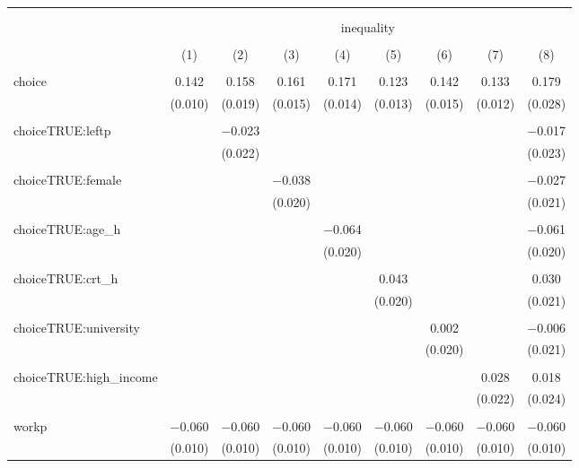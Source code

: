 
\begin{table}[!htbp] \centering 
  \caption{} 
  \label{} 
\begin{tabular}{@{\extracolsep{5pt}}lcccccccc} 
\\[-1.8ex]\hline 
\hline \\[-1.8ex] 
\\[-1.8ex] & \multicolumn{8}{c}{inequality} \\ 
\\[-1.8ex] & (1) & (2) & (3) & (4) & (5) & (6) & (7) & (8)\\ 
\hline \\[-1.8ex] 
 choice & 0.142 & 0.158 & 0.161 & 0.171 & 0.123 & 0.142 & 0.133 & 0.179 \\ 
  & (0.010) & (0.019) & (0.015) & (0.014) & (0.013) & (0.015) & (0.012) & (0.028) \\ 
  & & & & & & & & \\ 
 choiceTRUE:leftp &  & $-$0.023 &  &  &  &  &  & $-$0.017 \\ 
  &  & (0.022) &  &  &  &  &  & (0.023) \\ 
  & & & & & & & & \\ 
 choiceTRUE:female &  &  & $-$0.038 &  &  &  &  & $-$0.027 \\ 
  &  &  & (0.020) &  &  &  &  & (0.021) \\ 
  & & & & & & & & \\ 
 choiceTRUE:age\_h &  &  &  & $-$0.064 &  &  &  & $-$0.061 \\ 
  &  &  &  & (0.020) &  &  &  & (0.020) \\ 
  & & & & & & & & \\ 
 choiceTRUE:crt\_h &  &  &  &  & 0.043 &  &  & 0.030 \\ 
  &  &  &  &  & (0.020) &  &  & (0.021) \\ 
  & & & & & & & & \\ 
 choiceTRUE:university &  &  &  &  &  & 0.002 &  & $-$0.006 \\ 
  &  &  &  &  &  & (0.020) &  & (0.021) \\ 
  & & & & & & & & \\ 
 choiceTRUE:high\_income &  &  &  &  &  &  & 0.028 & 0.018 \\ 
  &  &  &  &  &  &  & (0.022) & (0.024) \\ 
  & & & & & & & & \\ 
 workp & $-$0.060 & $-$0.060 & $-$0.060 & $-$0.060 & $-$0.060 & $-$0.060 & $-$0.060 & $-$0.060 \\ 
  & (0.010) & (0.010) & (0.010) & (0.010) & (0.010) & (0.010) & (0.010) & (0.010) \\ 

\end{tabular}
\end{table}
